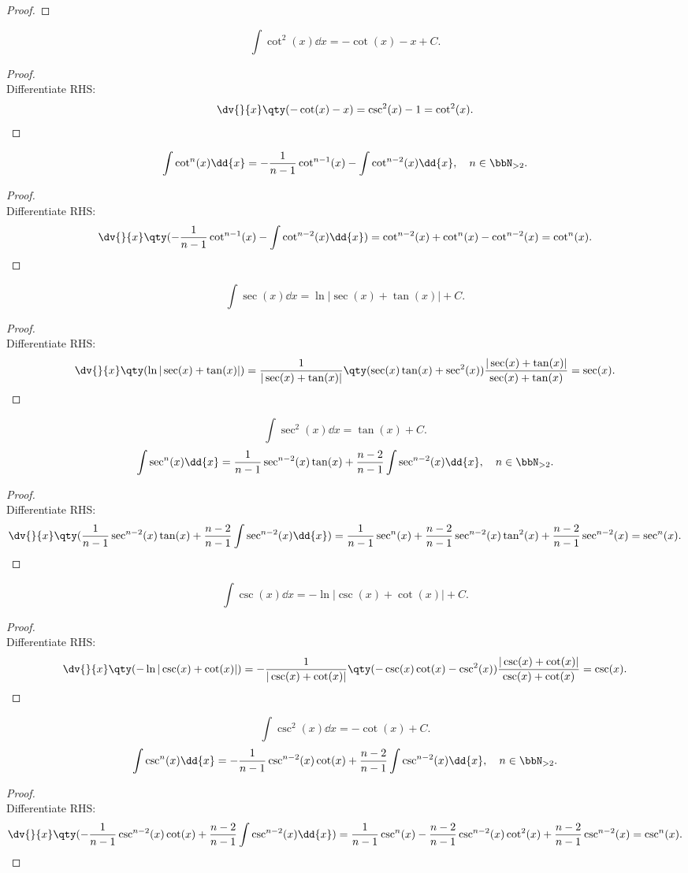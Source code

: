\documentclass[a4paper,12pt]{report}
\begin{document}
\begin{itemize}
\begin{itemize}
\begin{proof}
\end{proof}
\[\int\cot^2(x)\dd{x}=-\cot(x)-x+C.\]
\begin{proof}\mbox{}\\
    Differentiate RHS:
    \[\dv{}{x}\qty(-\cot(x)-x)=\csc^2(x)-1=\cot^2(x).\]
\end{proof}
\[\int\cot^n(x)\dd{x}=-\frac{1}{n-1}\cot^{n-1}(x)-\int\cot^{n-2}(x)\dd{x},\quad n\in\bbN_{>2}.\]
\begin{proof}\mbox{}\\
    Differentiate RHS:
    \[\dv{}{x}\qty(-\frac{1}{n-1}\cot^{n-1}(x)-\int\cot^{n-2}(x)\dd{x})=\cot^{n-2}(x)+\cot^n(x)-\cot^{n-2}(x)=\cot^n(x).\]
\end{proof}
\[\int\sec(x)\dd{x}=\ln|\sec(x)+\tan(x)|+C.\]
\begin{proof}\mbox{}\\
    Differentiate RHS:
    \[\dv{}{x}\qty(\ln|\sec(x)+\tan(x)|)=\frac{1}{|\sec(x)+\tan(x)|}\qty(\sec(x)\tan(x)+\sec^2(x))\frac{|\sec(x)+\tan(x)|}{\sec(x)+\tan(x)}=\sec(x).\]
\end{proof}
\[\int\sec^2(x)\dd{x}=\tan(x)+C.\]
\[\int\sec^n(x)\dd{x}=\frac{1}{n-1}\sec^{n-2}(x)\tan(x)+\frac{n-2}{n-1}\int\sec^{n-2}(x)\dd{x},\quad n\in\bbN_{>2}.\]
\begin{proof}\mbox{}\\
    Differentiate RHS:
    \[\dv{}{x}\qty(\frac{1}{n-1}\sec^{n-2}(x)\tan(x)+\frac{n-2}{n-1}\int\sec^{n-2}(x)\dd{x})=\frac{1}{n-1}\sec^n(x)+\frac{n-2}{n-1}\sec^{n-2}(x)\tan^2(x)+\frac{n-2}{n-1}\sec^{n-2}(x)=\sec^n(x).\]
\end{proof}
\[\int\csc(x)\dd{x}=-\ln|\csc(x)+\cot(x)|+C.\]
\begin{proof}\mbox{}\\
    Differentiate RHS:
    \[\dv{}{x}\qty(-\ln|\csc(x)+\cot(x)|)=-\frac{1}{|\csc(x)+\cot(x)|}\qty(-\csc(x)\cot(x)-\csc^2(x))\frac{|\csc(x)+\cot(x)|}{\csc(x)+\cot(x)}=\csc(x).\]
\end{proof}
\[\int\csc^2(x)\dd{x}=-\cot(x)+C.\]
\[\int\csc^n(x)\dd{x}=-\frac{1}{n-1}\csc^{n-2}(x)\cot(x)+\frac{n-2}{n-1}\int\csc^{n-2}(x)\dd{x},\quad n\in\bbN_{>2}.\]
\begin{proof}\mbox{}\\
    Differentiate RHS:
    \[\dv{}{x}\qty(-\frac{1}{n-1}\csc^{n-2}(x)\cot(x)+\frac{n-2}{n-1}\int\csc^{n-2}(x)\dd{x})=\frac{1}{n-1}\csc^n(x)-\frac{n-2}{n-1}\csc^{n-2}(x)\cot^2(x)+\frac{n-2}{n-1}\csc^{n-2}(x)=\csc^n(x).\]
\end{proof}

\end{itemize}
\end{itemize}
\end{document}
